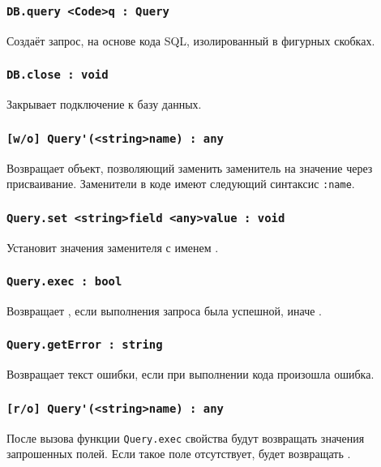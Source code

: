 \subsubsection{\lstinline|DB.query <Code>q : Query|}

Создаёт запрос, на основе кода SQL, изолированный в фигурных скобках.

\subsubsection{\lstinline|DB.close : void|}

Закрывает подключение к базу данных.

\subsubsection{\lstinline|[w/o] Query'(<string>name) : any|}

Возвращает объект, позволяющий заменить заменитель на значение через присваивание. Заменители в коде имеют следующий синтаксис \lstinline|:name|.

\subsubsection{\lstinline|Query.set <string>field <any>value : void|}

Установит значения заменителя с именем .

\subsubsection{\lstinline|Query.exec : bool|}

Возвращает \true, если выполнения запроса была успешной, иначе \false.

\subsubsection{\lstinline|Query.getError : string|}

Возвращает текст ошибки, если при выполнении кода произошла ошибка.

\subsubsection{\lstinline|[r/o] Query'(<string>name) : any|}

После вызова функции \lstinline|Query.exec| свойства будут возвращать значения запрошенных полей. Если такое поле отсутствует, будет возвращать \void.

